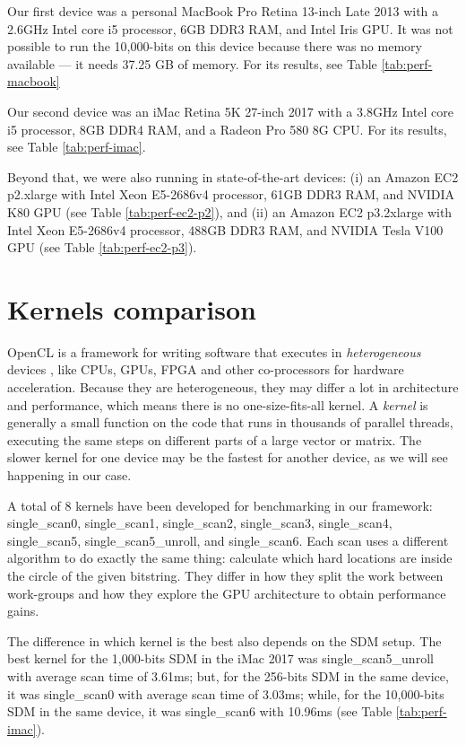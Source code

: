 Our first device was a personal MacBook Pro Retina 13-inch Late 2013 with a 2.6GHz Intel core i5 processor, 6GB DDR3 RAM, and Intel Iris GPU. It was not possible to run the 10,000-bits on this device because there was no memory available --- it needs 37.25 GB of memory. For its results, see Table \ref{tab:perf-macbook}

Our second device was an iMac Retina 5K 27-inch 2017 with a 3.8GHz Intel core i5 processor, 8GB DDR4 RAM, and a Radeon Pro 580 8G CPU. For its results, see Table \ref{tab:perf-imac}.

Beyond that, we were also running in state-of-the-art devices: (i) an Amazon EC2 p2.xlarge with Intel Xeon E5-2686v4 processor, 61GB DDR3 RAM, and NVIDIA K80 GPU (see Table \ref{tab:perf-ec2-p2}), and (ii) an Amazon EC2 p3.2xlarge with Intel Xeon E5-2686v4 processor, 488GB DDR3 RAM, and NVIDIA Tesla V100 GPU (see Table \ref{tab:perf-ec2-p3}).
 

\section{Kernels comparison}

OpenCL is a framework for writing software that executes in \emph{heterogeneous} devices \citep{munshi2009opencl}, like CPUs, GPUs, FPGA and other co-processors for hardware acceleration. Because they are heterogeneous, they may differ a lot in architecture and performance, which means there is no one-size-fits-all kernel. A \emph{kernel} is generally a small function on the code that runs in thousands of parallel threads, executing the same steps on different parts of a large vector or matrix. The slower kernel for one device may be the fastest for another device, as we will see happening in our case.

A total of 8 kernels have been developed for benchmarking in our framework: single\_scan0, single\_scan1, single\_scan2, single\_scan3, single\_scan4, single\_scan5, single\_scan5\_unroll, and single\_scan6. Each scan uses a different algorithm to do exactly the same thing: calculate which hard locations are inside the circle of the given bitstring. They differ in how they split the work between work-groups and how they explore the GPU architecture to obtain performance gains.

The difference in which kernel is the best also depends on the SDM setup. The best kernel for the 1,000-bits SDM in the iMac 2017 was single\_scan5\_unroll with average scan time of 3.61ms; but, for the 256-bits SDM in the same device, it was single\_scan0 with average scan time of 3.03ms; while, for the 10,000-bits SDM in the same device, it was single\_scan6 with 10.96ms (see Table \ref{tab:perf-imac}).

